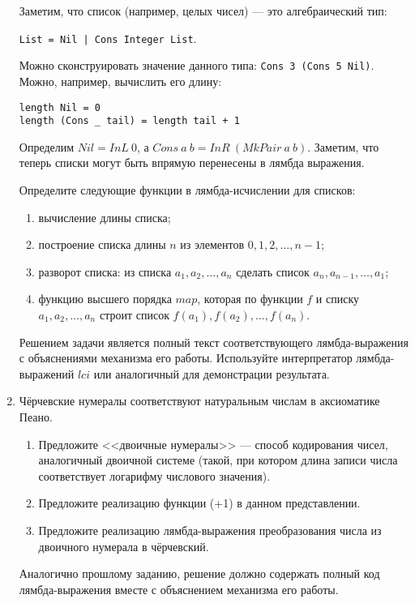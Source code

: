 \documentclass[10pt,a4paper,oneside]{article}
\begin{document}
\begin{enumerate}
Заметим, что список (например, целых чисел) — это алгебраический тип: 

\verb!List = Nil | Cons Integer List!.

Можно сконструировать значение данного типа: \verb!Cons 3 (Cons 5 Nil)!.
Можно, например, вычислить его длину:
\begin{verbatim}
length Nil = 0
length (Cons _ tail) = length tail + 1
\end{verbatim}

Определим $Nil = InL\ 0$, а $Cons\ a\ b = InR\ (MkPair\ a\ b)$. Заметим, что теперь списки могут быть впрямую
перенесены в лямбда выражения. 

Определите следующие функции в лямбда-исчислении для списков:
\begin{enumerate}
\item вычисление длины списка;
\item построение списка длины $n$ из элементов $0, 1, 2, \dots, n-1$;
\item разворот списка: из списка $a_1, a_2, \dots, a_n$ сделать список $a_n, a_{n-1}, \dots, a_1$;
\item функцию высшего порядка $map$, которая по функции $f$ и списку $a_1, a_2, \dots, a_n$
строит список $f(a_1), f(a_2), \dots, f(a_n)$.
\end{enumerate}

Решением задачи является полный текст соответствующего лямбда-выражения с объяснениями механизма его работы.
Используйте интерпретатор лямбда-выражений $lci$ или аналогичный для демонстрации результата.

\item Чёрчевские нумералы соответствуют натуральным числам в аксиоматике Пеано.
\begin{enumerate}
\item Предложите <<двоичные нумералы>> --- способ кодирования чисел, аналогичный двоичной системе 
(такой, при котором длина записи числа соответствует логарифму числового значения).
\item Предложите реализацию функции (+1) в данном представлении.
\item Предложите реализацию лямбда-выражения преобразования числа из двоичного нумерала в чёрчевский.
\end{enumerate}

Аналогично прошлому заданию, решение должно содержать полный код лямбда-выражения вместе с объяснением механизма его работы.

\end{enumerate}
\end{document}
